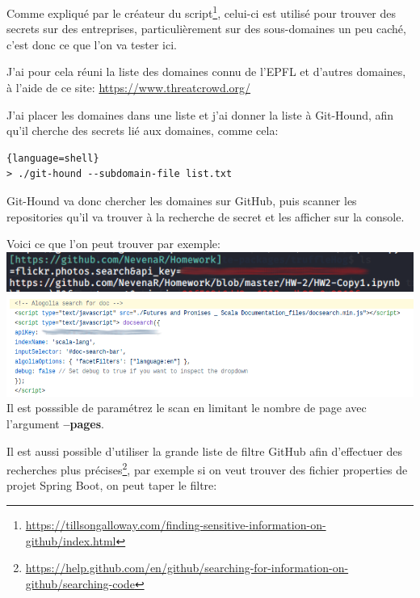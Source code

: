 Comme expliqué par le créateur du script\footnote{\url{https://tillsongalloway.com/finding-sensitive-information-on-github/index.html}}, 
celui-ci est utilisé pour trouver des secrets sur des entreprises, particulièrement sur des sous-domaines un peu caché, c'est donc ce que l'on va tester ici.

J'ai pour cela réuni la liste des domaines connu de l'EPFL et d'autres domaines, à l'aide de ce site: \url{https://www.threatcrowd.org/}

J'ai placer les domaines dans une liste et j'ai donner la liste à Git-Hound, afin qu'il cherche des secrets lié aux domaines, comme cela:

\begin{lstlisting}{language=shell}
> ./git-hound --subdomain-file list.txt
\end{lstlisting}
  
Git-Hound va donc chercher les domaines sur GitHub, puis scanner les repositories qu'il va trouver à la recherche de secret et les afficher sur la console.

Voici ce que l'on peut trouver par exemple: \\

\includegraphics[scale=0.48]{images/SEN_Projet_Image014.png} \\

\includegraphics[scale=0.48]{images/SEN_Projet_Image013.png} \\

Il est posssible de paramétrez le scan en limitant le nombre de page avec l'argument {\bfseries --pages}.

Il est aussi possible d'utiliser la grande liste de filtre GitHub afin d'effectuer des recherches plus précises\footnote{\url{https://help.github.com/en/github/searching-for-information-on-github/searching-code}},
par exemple si on veut trouver des fichier properties de projet Spring Boot, on peut taper le filtre:
\\

